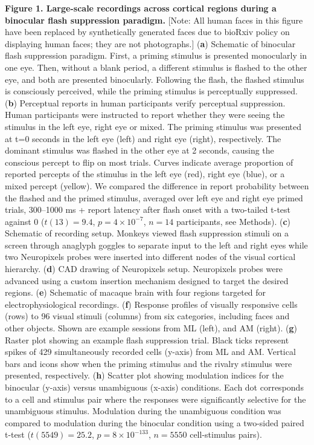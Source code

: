 \documentclass{article}
\begin{document}
\noindent\textbf{Figure 1. Large-scale recordings across cortical regions during a binocular flash suppression paradigm.} [Note: All human faces in this figure have been replaced by synthetically generated faces due to bioRxiv policy on displaying human faces; they are not photographs.] (\textbf{a}) Schematic of binocular flash suppression paradigm. First, a priming stimulus is presented monocularly in one eye. Then, without a blank period, a different stimulus is flashed to the other eye, and both are presented binocularly. Following the flash, the flashed stimulus is consciously perceived, while the priming stimulus is perceptually suppressed. (\textbf{b}) Perceptual reports in human participants verify perceptual suppression. Human participants were instructed to report whether they were seeing the stimulus in the left eye, right eye or mixed. The priming stimulus was presented at t=0 seconds in the left eye (left) and right eye (right), respectively. The dominant stimulus was flashed in the other eye at 2 seconds, causing the conscious percept to flip on most trials. Curves indicate average proportion of reported percepts of the stimulus in the left eye (red), right eye (blue), or a mixed percept (yellow). We compared the difference in report probability between the flashed and the primed stimulus, averaged over left eye and right eye primed trials, 300--1000 ms + report latency after flash onset with a two-tailed t-test against 0 ($t(13) = 9.4$, $p = 4 \times 10^{-7}$, $n = 14$ participants, see Methods). (\textbf{c}) Schematic of recording setup. Monkeys viewed flash suppression stimuli on a screen through anaglyph goggles to separate input to the left and right eyes while two Neuropixels probes were inserted into different nodes of the visual cortical hierarchy. (\textbf{d}) CAD drawing of Neuropixels setup. Neuropixels probes were advanced using a custom insertion mechanism designed to target the desired regions. (\textbf{e}) Schematic of macaque brain with four regions targeted for electrophysiological recordings. (\textbf{f}) Response profiles of visually responsive cells (rows) to 96 visual stimuli (columns) from six categories, including faces and other objects. Shown are example sessions from ML (left), and AM (right). (\textbf{g}) Raster plot showing an example flash suppression trial. Black ticks represent spikes of 429 simultaneously recorded cells (y-axis) from ML and AM. Vertical bars and icons show when the priming stimulus and the rivalry stimulus were presented, respectively. (\textbf{h}) Scatter plot showing modulation indices for the binocular (y-axis) versus unambiguous (x-axis) conditions. Each dot corresponds to a cell and stimulus pair where the responses were significantly selective for the unambiguous stimulus. Modulation during the unambiguous condition was compared to modulation during the binocular condition using a two-sided paired t-test ($t(5549) = 25.2$, $p = 8 \times 10^{-133}$, $n = 5550$ cell-stimulus pairs).
\end{document}

